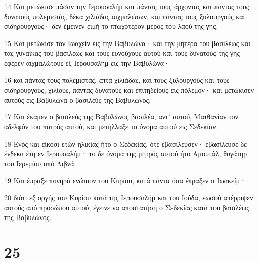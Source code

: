 \par 14 Και μετώκισε πάσαν την Ιερουσαλήμ και πάντας τους άρχοντας και πάντας τους δυνατούς πολεμιστάς, δέκα χιλιάδας αιχμαλώτων, και πάντας τους ξυλουργούς και σιδηρουργούς· δεν έμεινεν ειμή το πτωχότερον μέρος του λαού της γης.
\par 15 Και μετώκισε τον Ιωαχείν εις την Βαβυλώνα· και την μητέρα του βασιλέως και τας γυναίκας του βασιλέως και τους ευνούχους αυτού και τους δυνατούς της γης έφερεν αιχμαλώτους εξ Ιερουσαλήμ εις την Βαβυλώνα·
\par 16 και πάντας τους πολεμιστάς, επτά χιλιάδας, και τους ξυλουργούς και τους σιδηρουργούς, χιλίους, πάντας δυνατούς και επιτηδείους εις πόλεμον· και μετώκισεν αυτούς εις Βαβυλώνα ο βασιλεύς της Βαβυλώνος.
\par 17 Και έκαμεν ο βασιλεύς της Βαβυλώνος βασιλέα, αντ' αυτού, Ματθανίαν τον αδελφόν του πατρός αυτού, και μετήλλαξε το όνομα αυτού εις Σεδεκίαν.
\par 18 Ενός και είκοσι ετών ηλικίας ήτο ο Σεδεκίας, ότε εβασίλευσεν· εβασίλευσε δε ένδεκα έτη εν Ιερουσαλήμ· το δε όνομα της μητρός αυτού ήτο Αμουτάλ, θυγάτηρ του Ιερεμίου από Λιβνά.
\par 19 Και έπραξε πονηρά ενώπιον του Κυρίου, κατά πάντα όσα έπραξεν ο Ιωακείμ·
\par 20 διότι εξ οργής του Κυρίου κατά της Ιερουσαλήμ και του Ιούδα, εωσού απέρριψεν αυτούς από προσώπου αυτού, έγεινε να αποστατήση ο Σεδεκίας κατά του βασιλέως της Βαβυλώνος.

\chapter{25}

